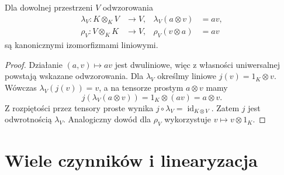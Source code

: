 \begin{twierdzenie}
\label{thm:lin9-jednostka}
Dla dowolnej przestrzeni \(V\)
odwzorowania
\[
 \begin{aligned}
 \lambda_V\colon K\otimes_KV&\to V,
 &\lambda_V(a\otimes v)&=av,\\
 \rho_V\colon V\otimes_KK&\to V,
 &\rho_V(v\otimes a)&=av
 \end{aligned}
\]
są kanonicznymi izomorfizmami liniowymi.
\end{twierdzenie}
\begin{proof}
Działanie \((a,v)\mapsto av\)
jest dwuliniowe, więc
z własności uniwersalnej
powstają wskazane odwzorowania.
Dla \(\lambda_V\) określmy
liniowe \(j(v)=1_K\otimes v\).
Wówczas \(\lambda_V(j(v))=v\),
a na tensorze prostym
\(a\otimes v\) mamy
\[
 j(\lambda_V(a\otimes v))
 =1_K\otimes(av)
 =a\otimes v.
\]
Z rozpiętości przez tensory proste
wynika \(j\circ\lambda_V
=\operatorname{id}_{K\otimes V}\).
Zatem \(j\) jest odwrotnością
\(\lambda_V\).
Analogiczny dowód dla \(\rho_V\)
wykorzystuje \(v\mapsto v\otimes1_K\).
\end{proof}

\section{Wiele czynników i linearyzacja}
\label{sec:lin9-wielokrotne}


